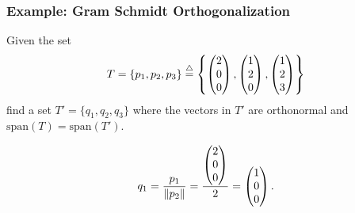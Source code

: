 \documentclass{beamer}
\begin{document}
\begin{frame}\frametitle{Example: Gram Schmidt Orthogonalization}
Given the set
\[
T = \{ p_1, p_2, p_3 \} \stackrel{\triangle}{=} \left\{ \begin{pmatrix} 2 \\ 0 \\ 0 \end{pmatrix}, \begin{pmatrix}1 \\ 2 \\ 0 \end{pmatrix}, \begin{pmatrix} 1 \\ 2 \\ 3 \end{pmatrix} \right\}
\]	
find a set $T'=\{q_1, q_2, q_3\}$ where the vectors in $T'$ are orthonormal and $\text{span}(T)=\text{span}(T')$.

\vfill

\[
q_1 = \frac{p_1}{\left\|p_2\right\|} = \frac{\begin{pmatrix} 2 \\ 0 \\ 0 \end{pmatrix}}{2} = \begin{pmatrix} 1 \\ 0 \\ 0 \end{pmatrix}.
\]

\end{frame}
\end{document}
